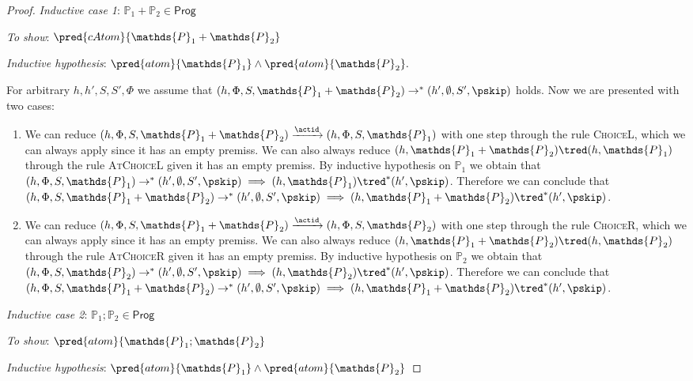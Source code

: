 {\begin{proof}
\textit{Inductive case 1}: $\mathds{P}_1 + \mathds{P}_2 \in \mathsf{Prog}$

\textit{To show}: $\pred{cAtom}{\mathds{P}_1 + \mathds{P}_2}$

\textit{Inductive hypothesis}: $\pred{atom}{\mathds{P}_1} \land \pred{atom}{\mathds{P}_2}.$

For arbitrary $h, h', S, S', \Phi$ we assume that $(h, \Phi, S, \mathds{P}_1 + \mathds{P}_2) \rightarrow^* (h', \emptyset, S', \pskip)$ holds. Now we are presented with two cases:
\begin{enumerate}
\item We can reduce $(h, \Phi, S, \mathds{P}_1 + \mathds{P}_2) \xrightarrow{\actid} (h, \Phi, S, \mathds{P}_1)$ with one step through the rule \textsc{ChoiceL}, which we can always apply since it has an empty premiss. We can also always reduce $(h, \mathds{P}_1 + \mathds{P}_2) \tred (h, \mathds{P}_1)$ through the rule \textsc{AtChoiceL} given it has an empty premiss. By inductive hypothesis on $\mathds{P}_1$ we obtain that $(h, \Phi, S, \mathds{P}_1) \rightarrow^* (h', \emptyset, S', \pskip) \implies (h, \mathds{P}_1) \tred^* (h', \pskip)$. Therefore we can conclude that $(h, \Phi, S, \mathds{P}_1 + \mathds{P}_2) \rightarrow^* (h', \emptyset, S', \pskip) \implies  (h, \mathds{P}_1 + \mathds{P}_2) \tred^* (h', \pskip)$.
\item We can reduce $(h, \Phi, S, \mathds{P}_1 + \mathds{P}_2) \xrightarrow{\actid} (h, \Phi, S, \mathds{P}_2)$ with one step through the rule \textsc{ChoiceR}, which we can always apply since it has an empty premiss. We can also always reduce $(h, \mathds{P}_1 + \mathds{P}_2) \tred (h, \mathds{P}_2)$ through the rule \textsc{AtChoiceR} given it has an empty premiss. By inductive hypothesis on $\mathds{P}_2$ we obtain that $(h, \Phi, S, \mathds{P}_2) \rightarrow^* (h', \emptyset, S', \pskip) \implies (h, \mathds{P}_2) \tred^* (h', \pskip)$. Therefore we can conclude that $(h, \Phi, S, \mathds{P}_1 + \mathds{P}_2) \rightarrow^* (h', \emptyset, S', \pskip) \implies  (h, \mathds{P}_1 + \mathds{P}_2) \tred^* (h', \pskip)$. \\
\end{enumerate}

\textit{Inductive case 2}: $\mathds{P}_1 ; \mathds{P}_2 \in \mathsf{Prog}$

\textit{To show}: $\pred{atom}{\mathds{P}_1 ; \mathds{P}_2}$

\textit{Inductive hypothesis}: $\pred{atom}{\mathds{P}_1} \land \pred{atom}{\mathds{P}_2}$


\end{proof}}
